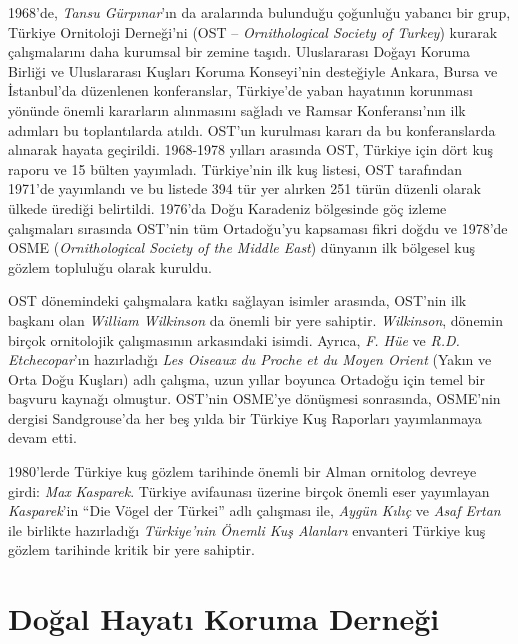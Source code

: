 \documentclass[
  a4paper,
  DIV=11,
  numbers=noendperiod]{scrartcl}
\begin{document}
1968'de, \emph{Tansu Gürpınar}'ın da aralarında bulunduğu çoğunluğu
yabancı bir grup, Türkiye Ornitoloji Derneği'ni (OST --
\emph{Ornithological Society of Turkey}) kurarak çalışmalarını daha
kurumsal bir zemine taşıdı. Uluslararası Doğayı Koruma Birliği ve
Uluslararası Kuşları Koruma Konseyi'nin desteğiyle Ankara, Bursa ve
İstanbul'da düzenlenen konferanslar, Türkiye'de yaban hayatının
korunması yönünde önemli kararların alınmasını sağladı ve Ramsar
Konferansı'nın ilk adımları bu toplantılarda atıldı. OST'un kurulması
kararı da bu konferanslarda alınarak hayata geçirildi. 1968-1978 yılları
arasında OST, Türkiye için dört kuş raporu ve 15 bülten yayımladı.
Türkiye'nin ilk kuş listesi, OST tarafından 1971'de yayımlandı ve bu
listede 394 tür yer alırken 251 türün düzenli olarak ülkede ürediği
belirtildi. 1976'da Doğu Karadeniz bölgesinde göç izleme çalışmaları
sırasında OST'nin tüm Ortadoğu'yu kapsaması fikri doğdu ve 1978'de OSME
(\emph{Ornithological Society of the Middle East}) dünyanın ilk bölgesel
kuş gözlem topluluğu olarak kuruldu.

OST dönemindeki çalışmalara katkı sağlayan isimler arasında, OST'nin ilk
başkanı olan \emph{William Wilkinson} da önemli bir yere sahiptir.
\emph{Wilkinson}, dönemin birçok ornitolojik çalışmasının arkasındaki
isimdi. Ayrıca, \emph{F. Hüe} ve \emph{R.D. Etchecopar}'ın hazırladığı
\emph{Les Oiseaux du Proche et du Moyen Orient} (Yakın ve Orta Doğu
Kuşları) adlı çalışma, uzun yıllar boyunca Ortadoğu için temel bir
başvuru kaynağı olmuştur. OST'nin OSME'ye dönüşmesi sonrasında, OSME'nin
dergisi Sandgrouse'da her beş yılda bir Türkiye Kuş Raporları
yayımlanmaya devam etti.

1980'lerde Türkiye kuş gözlem tarihinde önemli bir Alman ornitolog
devreye girdi: \emph{Max} \emph{Kasparek}. Türkiye avifaunası üzerine
birçok önemli eser yayımlayan \emph{Kasparek}'in ``Die Vögel der
Türkei'' adlı çalışması ile, \emph{Aygün Kılıç} ve \emph{Asaf Ertan} ile
birlikte hazırladığı \emph{Türkiye'nin Önemli Kuş Alanları} envanteri
Türkiye kuş gözlem tarihinde kritik bir yere sahiptir.

\section*{Doğal Hayatı Koruma
Derneği}\label{doux11fal-hayatux131-koruma-derneux11fi}

\end{document}
